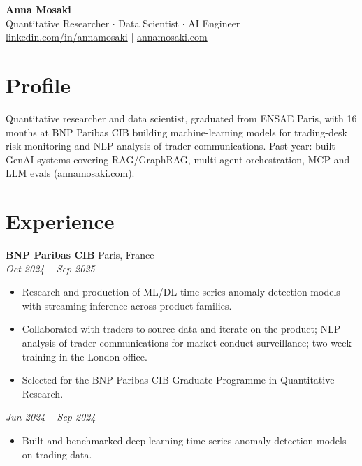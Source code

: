 \documentclass[10.3pt]{article}
\renewcommand{\cvheader}[1]{%
  \begin{center}
    {\color{ink}\huge\bfseries Anna Mosaki}\\[2pt]
    {\large #1}\\[4pt]
    {\small
      \href{https://www.linkedin.com/in/annamosaki/}{linkedin.com/in/annamosaki} \quad|\quad
      \href{https://annamosaki.com}{annamosaki.com}
    }
  \end{center}
  \vspace{-2pt}
}
\begin{document}
\RaggedRight

\cvheader{Quantitative Researcher \(\cdot\) Data Scientist \(\cdot\) AI Engineer}

\section*{Profile}
Quantitative researcher and data scientist, graduated from ENSAE Paris, with 16 months at BNP Paribas CIB building machine-learning models for trading-desk risk monitoring and NLP analysis of trader communications. Past year: built GenAI systems covering RAG/GraphRAG, multi-agent orchestration, MCP and LLM evals (annamosaki.com).

\section*{Experience}

{\bfseries BNP Paribas CIB} \hfill {\color{gray}\small Paris, France}\\[4pt]
\hspace*{9pt}\hspace{5pt}{\itshape Quantitative Researcher -- Data Scientist} \hfill {\itshape\color{gray}\small Oct 2024 -- Sep 2025}\\[2pt]
\begin{itemize}[leftmargin=3.4em]
  \item Research and production of ML/DL time-series anomaly-detection models with streaming inference across product families.
  \item Collaborated with traders to source data and iterate on the product; NLP analysis of trader communications for market-conduct surveillance; two-week training in the London office.
  \item Selected for the BNP Paribas CIB Graduate Programme in Quantitative Research.
\end{itemize}
\vspace{4pt}
\hspace*{9pt}\hspace{5pt}{\itshape Quantitative Researcher -- Data Scientist, Summer Intern} \hfill {\itshape\color{gray}\small Jun 2024 -- Sep 2024}\\[2pt]
\begin{itemize}[leftmargin=3.4em]
  \item Built and benchmarked deep-learning time-series anomaly-detection models on trading data.
\end{itemize}
\end{document}
